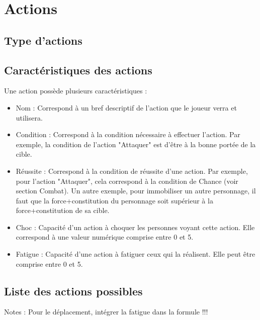 \section{Actions}
\subsection{Type d'actions}
\subsection{Caractéristiques des actions}
Une action possède plusieurs caractéristiques :
\begin{itemize}
  \item Nom : Correspond à un bref descriptif de l'action que le joueur verra et utilisera.
  \item Condition : Correspond à la condition nécessaire à effectuer l'action. Par exemple, la condition de l'action "Attaquer" est d'être à la bonne portée de la cible.
  \item Réussite : Correspond à la condition de réussite d'une action. Par exemple, pour l'action "Attaquer", cela correspond à la condition de Chance (voir section Combat). Un autre exemple, pour immobiliser un autre personnage, il faut que la force+constitution du personnage soit supérieur à la force+constitution de sa cible.
  \item Choc : Capacité d'un action à choquer les personnes voyant cette action. Elle correspond à une valeur numérique comprise entre 0 et 5.
  \item Fatigue : Capacité d'une action à fatiguer ceux qui la réalisent. Elle peut être comprise entre 0 et 5.
\end{itemize}
\subsection{Liste des actions possibles}


Notes : Pour le déplacement, intégrer la fatigue dans la formule !!!